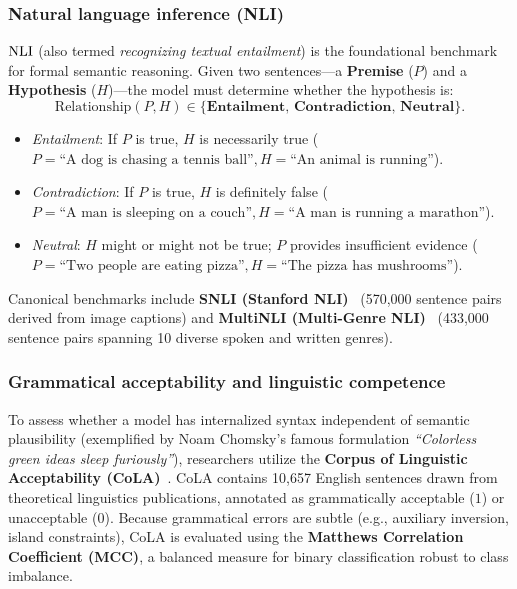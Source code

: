 \documentclass[../../main.tex]{subfiles}
\begin{document}
\subsubsection{Natural language inference (NLI)}
$\mathrm{NLI}$ (also termed \textit{recognizing textual entailment}) is the foundational benchmark for formal semantic reasoning. Given two sentences---a \textbf{Premise} ($P$) and a \textbf{Hypothesis} ($H$)---the model must determine whether the hypothesis is:
\begin{equation}
\label{eq:nli_labels}
\text{Relationship}(P, H) \in \{\textbf{Entailment}, \, \textbf{Contradiction}, \, \textbf{Neutral}\}.
\end{equation}
\begin{itemize}
    \item \textit{Entailment}: If $P$ is true, $H$ is necessarily true ($P = \text{``A dog is chasing a tennis ball''}, H = \text{``An animal is running''}$).
    \item \textit{Contradiction}: If $P$ is true, $H$ is definitely false ($P = \text{``A man is sleeping on a couch''}, H = \text{``A man is running a marathon''}$).
    \item \textit{Neutral}: $H$ might or might not be true; $P$ provides insufficient evidence ($P = \text{``Two people are eating pizza''}, H = \text{``The pizza has mushrooms''}$).
\end{itemize}
Canonical benchmarks include \textbf{SNLI (Stanford NLI)}~\cite{bowman2015snli} (570,000 sentence pairs derived from image captions) and \textbf{MultiNLI (Multi-Genre NLI)}~\cite{williams2018multinli} (433,000 sentence pairs spanning 10 diverse spoken and written genres).

\subsubsection{Grammatical acceptability and linguistic competence}
To assess whether a model has internalized syntax independent of semantic plausibility (exemplified by Noam Chomsky's famous formulation \textit{``Colorless green ideas sleep furiously''}), researchers utilize the \textbf{Corpus of Linguistic Acceptability (CoLA)}~\cite{warstadt2019cola}. CoLA contains 10,657 English sentences drawn from theoretical linguistics publications, annotated as grammatically acceptable ($1$) or unacceptable ($0$). Because grammatical errors are subtle (e.g., auxiliary inversion, island constraints), CoLA is evaluated using the \textbf{Matthews Correlation Coefficient (MCC)}, a balanced measure for binary classification robust to class imbalance.
\end{document}
